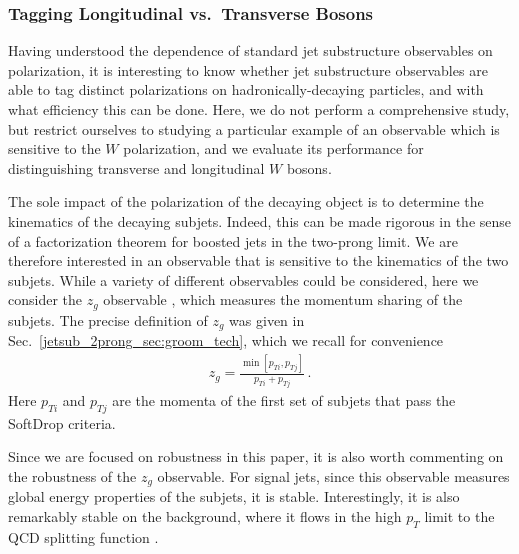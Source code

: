 \documentclass[11pt]{cernrep}
\begin{document}
\subsubsection{Tagging Longitudinal vs.\ Transverse Bosons}\label{jetsub_2prong_sec:polar_tag}

Having understood the dependence of standard jet substructure observables on polarization, it is interesting to know whether jet substructure observables are able to tag distinct polarizations on hadronically-decaying particles, and with what efficiency this can be done.
%
Here, we do not perform a comprehensive study, but restrict ourselves to studying a particular example of an observable which is sensitive to the $W$ polarization, and we evaluate its performance for distinguishing transverse and longitudinal $W$ bosons. 

The sole impact of the polarization of the decaying object is to determine the kinematics of the decaying subjets.
%
Indeed, this can be made rigorous in the sense of a factorization theorem for boosted jets in the two-prong limit.
%
We are therefore interested in an observable that is sensitive to the kinematics of the two subjets.
%
While a variety of different observables could be considered, here we consider the $z_g$ observable \cite{Larkoski:2014wba,Larkoski:2014bia,Larkoski:2015lea}, which measures the momentum sharing of the subjets. The precise definition of $z_g$ was given in Sec.~\ref{jetsub_2prong_sec:groom_tech}, which we recall for convenience
\begin{align}
z_g=\frac{\min\left[ p_{Ti}, p_{Tj}  \right]}{p_{Ti}+p_{Tj}}\,.
\end{align}
Here $p_{Ti}$ and $p_{Tj}$ are the momenta of the first set of subjets that pass the SoftDrop criteria.


Since we are focused on robustness in this paper, it is also worth commenting on the robustness of the $z_g$ observable. For signal jets, since this observable measures global energy properties of the subjets, it is stable.
%
Interestingly, it is also remarkably stable on the background, where it flows in the high $p_T$ limit to the QCD splitting function \cite{Larkoski:2014wba,Larkoski:2014bia,Larkoski:2015lea}.
\end{document}
